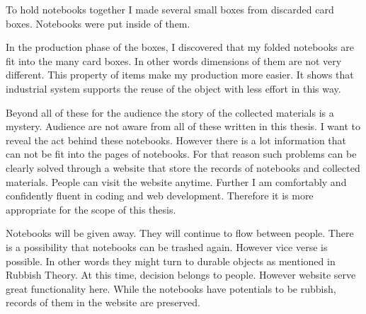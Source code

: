 To hold notebooks together I made several small boxes from discarded card boxes. Notebooks were put inside of them.

In the production phase of the boxes, I discovered that my folded notebooks are fit into the many card boxes. In other words dimensions of them are not very different. This property of items make my production more easier. It shows that industrial system supports the reuse of the object with less effort in this way.







Beyond all of these for the audience the story of the collected materials is a mystery. Audience are not aware from all of these written in this thesis. I want to reveal the act behind these notebooks. However there is a lot information that can not be fit into the pages of notebooks. For that reason such problems can be clearly solved through a website that store the records of notebooks and collected materials. People can visit the website anytime. Further I am comfortably and confidently fluent in coding and web development. Therefore it is more appropriate for the scope of this thesis.

Notebooks will be given away. They will continue to flow between people. There is a possibility that notebooks can be trashed again. However vice verse is possible. In other words they might turn to durable objects as mentioned in Rubbish Theory. At this time, decision belongs to people. However website serve great functionality here. While the notebooks have potentials to be rubbish, records of them in the website are preserved.





